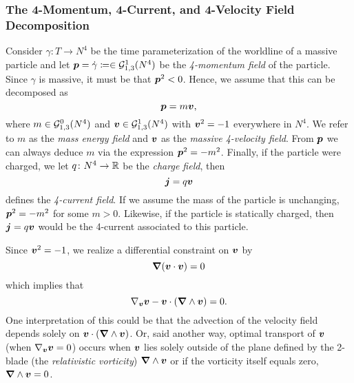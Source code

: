 \documentclass[conf]{new-aiaa}
\begin{document}
\subsubsection{The 4-Momentum, 4-Current, and 4-Velocity Field Decomposition}

Consider $\gamma \colon T \to N^4$ be the time parameterization of the worldline of a massive particle and let $\boldsymbol{p} = \dot{\gamma} \coloneqq \in \mathcal{G}_{1,3}^1(N^4)$ be the \emph{4-momentum field} of the particle. Since $\gamma$ is massive, it must be that $\boldsymbol{p}^2<0$. Hence, we assume that this can be decomposed as
\begin{equation}
    \boldsymbol{p} = m \boldsymbol{v},
\end{equation}
where $m\in \mathcal{G}_{1,3}^0(N^4)$ and $\boldsymbol{v} \in \mathcal{G}_{1,3}^1(N^4)$ with $\boldsymbol{v}^2=-1$ everywhere in $N^4$. We refer to $m$ as the \emph{mass energy field} and $\boldsymbol{v}$ as the \emph{massive 4-velocity field}. From $\boldsymbol{p}$ we can always deduce $m$ via the expression $\boldsymbol{p}^2 = -m^2$. Finally, if the particle were charged, we let $q\colon N^4 \to \mathbb{R}$ be the \emph{charge field}, then 
\begin{equation}
\boldsymbol{j}=q\boldsymbol{v}
\end{equation}
defines the \emph{4-current field}. If we assume the mass of the particle is unchanging, $\boldsymbol{p}^2=-m^2$ for some $m>0$. Likewise, if the particle is statically charged, then $\boldsymbol{j}=q\boldsymbol{v}$ would be the 4-current associated to this particle. 

Since $\boldsymbol{v}^2=-1$, we realize a differential constraint on ${\boldsymbol{v}}$ by
\begin{equation}
    \boldsymbol{\nabla} ({\boldsymbol{v}} \cdot {\boldsymbol{v}}) = 0 
\end{equation}
which implies that
\begin{equation}
    \label{eq:velocity_covariant_derivative}
    \nabla_{\boldsymbol{v}} {\boldsymbol{v}} - {\boldsymbol{v}}\cdot (\boldsymbol{\nabla} \wedge {\boldsymbol{v}}) = 0.
\end{equation}
One interpretation of this could be that the advection of the velocity field depends solely on ${\boldsymbol{v}} \cdot (\boldsymbol{\nabla} \wedge {\boldsymbol{v}})$. Or, said another way, optimal transport of ${\boldsymbol{v}}$ (when $\nabla_{\boldsymbol{v}} {\boldsymbol{v}} = 0$) occurs when ${\boldsymbol{v}}$ lies solely outside of the plane defined by the 2-blade (the \emph{relativistic vorticity}) $\boldsymbol{\nabla} \wedge {\boldsymbol{v}}$ or if the vorticity itself equals zero, $\boldsymbol{\nabla} \wedge {\boldsymbol{v}} = 0$. 
\end{document}
